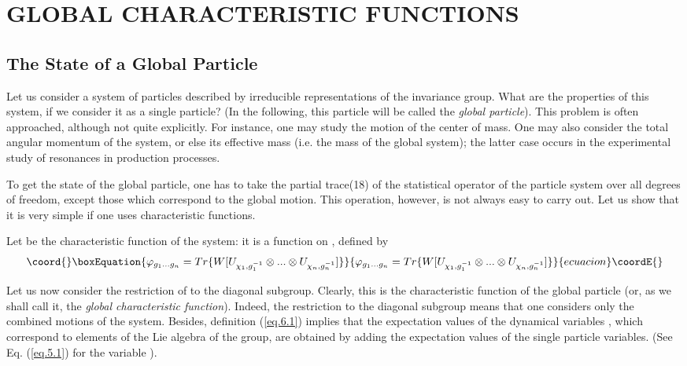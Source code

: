 \documentclass[a4paper,11pt]{article}
\begin{document}
\section{GLOBAL CHARACTERISTIC FUNCTIONS}

\subsection{The State of a Global Particle}

Let us consider a system of \coordHE{} particles described by irreducible representations of the 
invariance group. What are the properties of this system, if we consider it as a single 
particle? (In the following, this particle will be called the {\it global particle}). This 
problem is 
often approached, although not quite explicitly. For instance, one may study the motion of the 
center of mass. One may also consider the total angular momentum of the system, or else its 
effective mass (i.e. the mass of the global system); the latter case occurs in the experimental 
study of resonances in production processes. 

To get the state of the global particle, one has to take the partial trace(18) of the 
statistical operator of the \coordHE{} particle system over all degrees of freedom, except those which 
correspond to the global motion. This operation, however, is not always easy to carry out. Let 
us show that it is very simple if one uses characteristic functions. 

Let \myHighlight{$\phi$}\coordHE{} be the characteristic function of the system: it is a function on \coordHE{}, defined by 
\begin{equation}\coord{}\boxEquation{
 \label{eq.6.1}
    \phi_{g_1 ... g_n} = Tr \{ W [ U_{\chi_1,g_1^{-1}} \otimes ... \otimes U_{\chi_n,g_n^{-1}} ] \} 
}{
 \phi_{g_1 ... g_n} = Tr \{ W [ U_{\chi_1,g_1^{-1}} \otimes ... \otimes U_{\chi_n,g_n^{-1}} ] \} 
}{ecuacion}\coordE{}\end{equation}

Let us now consider the restriction \coordHE{} of \myHighlight{$\phi$}\coordHE{} to the diagonal subgroup. Clearly, 
this 
is the characteristic function of the global particle (or, as we shall call it, the {\it global 
characteristic function}). Indeed, the restriction to the diagonal subgroup means that one 
considers only the combined motions of the system. Besides, definition (\ref{eq.6.1}) implies 
that the 
expectation values of the dynamical variables \coordHE{}, which correspond to 
elements of the Lie 
algebra of the group, are obtained by adding the expectation values of the \coordHE{} single particle 
variables. (See Eq. (\ref{eq.5.1}) for the variable \coordHE{}). 
\end{document}
